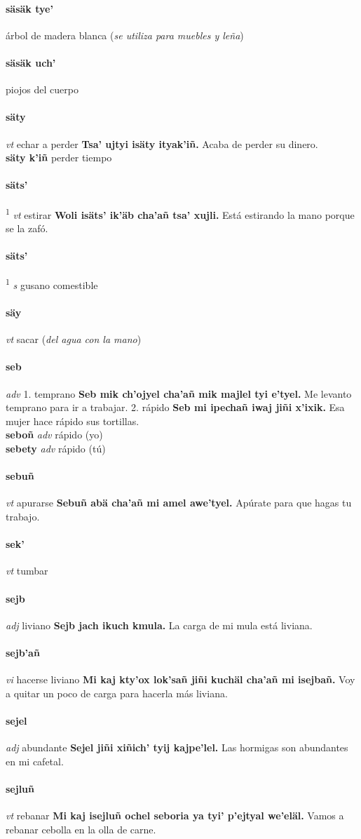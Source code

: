 \documentclass{scrbook}
\newcommand{\entry}[1]{\paragraph{#1}}
\newcommand{\onedefinition}[1]{#1.}
\newcommand{\defsuperscript}[1]{\textsuperscript{1}}
\newcommand{\partofspeech}[1]{\textit{#1}}
\newcommand{\spanishtranslation}[1]{#1}
\newcommand{\clarification}[1]{(\textit{#1})}
\newcommand{\cholexample}[1]{\textbf{#1}}
\newcommand{\exampletranslation}[1]{#1}
\newcommand{\secondaryentry}[1]{\\\textbf{#1}}
\newcommand{\secondpartofspeech}[1]{\textit{#1}}
\newcommand{\secondtranslation}[1]{#1}
\begin{document}
\begin{multicols}{2}
\entry{säsäk tye'}
\spanishtranslation{árbol de madera blanca}
\clarification{se utiliza para muebles y leña}

\entry{säsäk uch'}
\spanishtranslation{piojos del cuerpo}

\entry{säty}
\partofspeech{vt}
\spanishtranslation{echar a perder}
\cholexample{Tsa' ujtyi isäty ityak'iñ.}
\exampletranslation{Acaba de perder su dinero.}
\secondaryentry{säty k'iñ}
\secondtranslation{perder tiempo}

\entry{säts'}
\defsuperscript{1}
\partofspeech{vt}
\spanishtranslation{estirar}
\cholexample{Woli isäts' ik'äb cha'añ tsa' xujli.}
\exampletranslation{Está estirando la mano porque se la zafó.}

\entry{säts'}
\defsuperscript{2}
\partofspeech{s}
\spanishtranslation{gusano comestible}

\entry{säy}
\partofspeech{vt}
\spanishtranslation{sacar}
\clarification{del agua con la mano}

\entry{seb}
\partofspeech{adv}
\onedefinition{1}
\spanishtranslation{temprano}
\cholexample{Seb mik ch'ojyel cha'añ mik majlel tyi e'tyel.}
\exampletranslation{Me levanto temprano para ir a trabajar.}
\onedefinition{2}
\spanishtranslation{rápido}
\cholexample{Seb mi ipechañ iwaj jiñi x'ixik.}
\exampletranslation{Esa mujer hace rápido sus tortillas.}
\secondaryentry{seboñ}
\secondpartofspeech{adv}
\secondtranslation{rápido (yo)}
\secondaryentry{sebety}
\secondpartofspeech{adv}
\secondtranslation{rápido (tú)}

\entry{sebuñ}
\partofspeech{vt}
\spanishtranslation{apurarse}
\cholexample{Sebuñ abä cha'añ mi amel awe'tyel.}
\exampletranslation{Apúrate para que hagas tu trabajo.}

\entry{sek'}
\partofspeech{vt}
\spanishtranslation{tumbar}

\entry{sejb}
\partofspeech{adj}
\spanishtranslation{liviano}
\cholexample{Sejb jach ikuch kmula.}
\exampletranslation{La carga de mi mula está liviana.}

\entry{sejb'añ}
\partofspeech{vi}
\spanishtranslation{hacerse liviano}
\cholexample{Mi kaj kty'ox lok'sañ jiñi kuchäl cha'añ mi isejbañ.}
\exampletranslation{Voy a quitar un poco de carga para hacerla más liviana.}

\entry{sejel}
\partofspeech{adj}
\spanishtranslation{abundante}
\cholexample{Sejel jiñi xiñich' tyij kajpe'lel.}
\exampletranslation{Las hormigas son abundantes en mi cafetal.}

\entry{sejluñ}
\partofspeech{vt}
\spanishtranslation{rebanar}
\cholexample{Mi kaj isejluñ ochel seboria ya tyi' p'ejtyal we'eläl.}
\exampletranslation{Vamos a rebanar cebolla en la olla de carne.}


\end{multicols}
\end{document}
